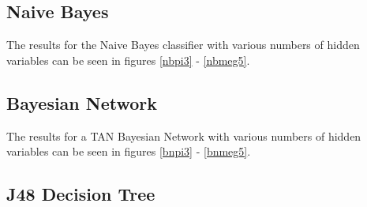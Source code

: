 \subsection{Naive Bayes}

The results for the Naive Bayes classifier with various numbers of hidden variables can be seen in figures \ref{nbpi3} - \ref{nbmeg5}.

\linespread{1.0}








\linespread{1.3}


\subsection{Bayesian Network}

The results for a TAN Bayesian Network with various numbers of hidden variables can be seen in figures \ref{bnpi3} - \ref{bnmeg5}.

\linespread{1.0}








\linespread{1.3}

\subsection{J48 Decision Tree}

\linespread{1.0}








\linespread{1.3}
